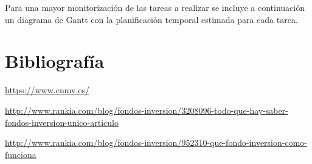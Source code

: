 \documentclass[12pt, a4paper]{article}
\begin{document}
Para una mayor monitorización de las tareas a realizar se incluye a continuación un diagrama de Gantt con la planificación temporal estimada para cada tarea.


\newpage

\part{Bibliografía}
\begin{thebibliography}{10}
	
	\bibitem[CNMV]{}
	\newline
	\href{https://www.cnmv.es/}{https://www.cnmv.es/}
	
	\bibitem[Rankia]{}
	\newline
	\href{http://www.rankia.com/blog/fondos-inversion/3208096-todo-que-hay-saber-fondos-inversion-unico-articulo}{http://www.rankia.com/blog/fondos-inversion/3208096-todo-que-hay-saber-fondos-inversion-unico-articulo}
	
	\bibitem[Rankia]{}
	\newline
	\href{http://www.rankia.com/blog/fondos-inversion/952310-que-fondo-inversion-como-funciona}{http://www.rankia.com/blog/fondos-inversion/952310-que-fondo-inversion-como-funciona}
	
	
	
	
\end{thebibliography}
\end{document}

